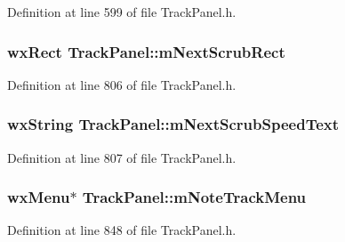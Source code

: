 Definition at line 599 of file Track\+Panel.\+h.

\subsubsection[{\texorpdfstring{m\+Next\+Scrub\+Rect}{mNextScrubRect}}]{\setlength{\rightskip}{0pt plus 5cm}wx\+Rect Track\+Panel\+::m\+Next\+Scrub\+Rect\hspace{0.3cm}{\ttfamily [protected]}}\hypertarget{class_track_panel_afb81dd5b46c408b3eb546ee7d600fed0}{}\label{class_track_panel_afb81dd5b46c408b3eb546ee7d600fed0}


Definition at line 806 of file Track\+Panel.\+h.

\subsubsection[{\texorpdfstring{m\+Next\+Scrub\+Speed\+Text}{mNextScrubSpeedText}}]{\setlength{\rightskip}{0pt plus 5cm}wx\+String Track\+Panel\+::m\+Next\+Scrub\+Speed\+Text\hspace{0.3cm}{\ttfamily [protected]}}\hypertarget{class_track_panel_aeb97bf6164e834af5dc57a013b35900e}{}\label{class_track_panel_aeb97bf6164e834af5dc57a013b35900e}


Definition at line 807 of file Track\+Panel.\+h.

\subsubsection[{\texorpdfstring{m\+Note\+Track\+Menu}{mNoteTrackMenu}}]{\setlength{\rightskip}{0pt plus 5cm}wx\+Menu$\ast$ Track\+Panel\+::m\+Note\+Track\+Menu\hspace{0.3cm}{\ttfamily [protected]}}\hypertarget{class_track_panel_ad273eaf93f9b710db1c9b52cddeeae84}{}\label{class_track_panel_ad273eaf93f9b710db1c9b52cddeeae84}


Definition at line 848 of file Track\+Panel.\+h.

